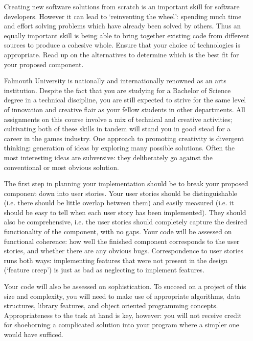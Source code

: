 \documentclass{../fal_assignment}
\begin{document}
Creating new software solutions from scratch is an important skill for software developers. However it can lead to `reinventing the wheel': spending much time and effort solving problems which have already been solved by others. Thus an equally important skill is being able to bring together existing code from different sources to produce a cohesive whole. Ensure that your choice of technologies is appropriate. Read up on the alternatives to determine which is the best fit for your proposed component. 

Falmouth University is nationally and internationally renowned as an arts institution. Despite the fact that you are studying for a Bachelor of Science degree in a technical discipline, you are still expected to strive for the same level of innovation and creative flair as your fellow students in other departments. All assignments on this course involve a mix of technical and creative activities; cultivating both of these skills in tandem will stand you in good stead for a career in the games industry. One approach to promoting creativity is divergent thinking: generation of ideas by exploring many possible solutions. Often the most interesting ideas are subversive: they deliberately go against the conventional or most obvious solution. 

The first step in planning your implementation should be to break your proposed component down into user stories. Your user stories should be distinguishable (i.e. there should be little overlap between them) and easily measured (i.e. it should be easy to tell when each user story has been implemented). They should also be comprehensive, i.e. the user stories should completely capture the desired functionality of the component, with no gaps. Your code will be assessed on functional coherence: how well the finished component corresponds to the user stories, and whether there are any obvious bugs. Correspondence to user stories runs both ways: implementing features that were not present in the design (`feature creep') is just as bad as neglecting to implement features. 

Your code will also be assessed on sophistication. To succeed on a project of this size and complexity, you will need to make use of appropriate algorithms, data structures, library features, and object oriented programming concepts. Appropriateness to the task at hand is key, however: you will not receive credit for shoehorning a complicated solution into your program where a simpler one would have sufficed. 
\end{document}
